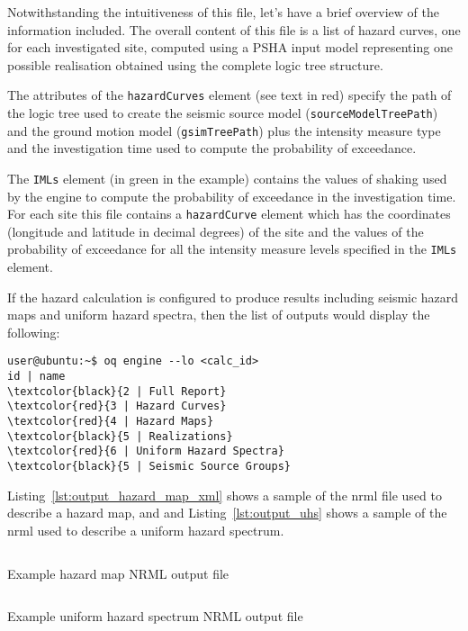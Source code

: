Notwithstanding the intuitiveness of this file, let's have a brief overview of
the information included. The overall content of this file is a list of hazard
curves, one for each investigated site, computed using a PSHA input model
representing one possible realisation obtained using the complete logic tree
structure.

The attributes of the \texttt{hazardCurves} element (see text in red) specify
the path of the logic tree used to create the seismic source model
(\texttt{source\-Model\-TreePath}) and the ground motion model
(\texttt{gsim\-Tree\-Path}) plus the intensity measure type and the
investigation time used to compute the probability of exceedance.

The \texttt{IMLs} element (in green in the example) contains the values of
shaking used by the engine to compute the probability of exceedance in the
investigation time. For each site this file contains a \texttt{hazardCurve}
element which has the coordinates (longitude and latitude in decimal degrees)
of the site and the values of the probability of exceedance for all the
intensity measure levels specified in the \texttt{IMLs} element.

If the hazard calculation is configured to produce results including seismic
hazard maps and uniform hazard spectra, then the list of outputs would display
the following:

\begin{Verbatim}[frame=single, commandchars=\\\{\}, fontsize=\small]
user@ubuntu:~$ oq engine --lo <calc_id>
id | name
\textcolor{black}{2 | Full Report}
\textcolor{red}{3 | Hazard Curves}
\textcolor{red}{4 | Hazard Maps}
\textcolor{black}{5 | Realizations}
\textcolor{red}{6 | Uniform Hazard Spectra}
\textcolor{black}{5 | Seismic Source Groups}
\end{Verbatim}

Listing~\ref{lst:output_hazard_map_xml} shows a sample of the nrml file
used to describe a hazard map, and and Listing~\ref{lst:output_uhs}
shows a sample of the nrml used to describe a uniform hazard spectrum.

\begin{listing}[htbp]
  \inputminted[firstline=1,firstnumber=1,fontsize=\footnotesize,frame=single,linenos,bgcolor=lightgray]{xml}{oqum/hazard/verbatim/output_hazard_map.xml}
  \caption{Example hazard map NRML output file}
  \label{lst:output_hazard_map_xml}
\end{listing}


\begin{listing}[htbp]
  \inputminted[firstline=1,firstnumber=1,fontsize=\footnotesize,frame=single,linenos,bgcolor=lightgray]{xml}{oqum/hazard/verbatim/output_uhs.xml}
  \caption{Example uniform hazard spectrum NRML output file}
  \label{lst:output_uhs}
\end{listing}
